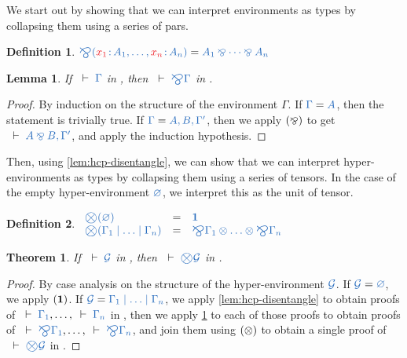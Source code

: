 \documentclass[draft,submission,copyright,creativecommons]{eptcs}
\newtheorem{definition}{Definition}
\newtheorem{lemma}{Lemma}
\newtheorem{theorem}{Theorem}
\begin{document}
We start out by showing that we can interpret environments as types by collapsing them using a series of pars.
\begin{definition}\label{def:bigparr}
  \(
  \ty{\bigparr(\tmty{x_1}{A_1} , \dots , \tmty{x_n}{A_n})} =
  \ty{A_1 \parr \dots \parr A_n}
  \)
\end{definition}\noindent
\begin{lemma}\label{lem:cp-bigparr}
  If $\seq{\Gamma}$ in \cp, then $\seq{\bigparr\Gamma}$ in \cp.
\end{lemma}\vspace*{-0.75\baselineskip}%
\begin{proof}
  By induction on the structure of the environment $\Gamma$.
  If $\ty{\Gamma} = \ty{A}$, then the statement is trivially true.
  If $\ty{\Gamma} = \ty{A, B, \Gamma'}$, then we apply $(\mathbin{\bindnasrepma})$ to get $\seq{A
    \parr B, \Gamma'}$, and apply the induction hypothesis.
\end{proof}\noindent
Then, using \cref{lem:hcp-disentangle}, we can show that we can interpret hyper-environments as types by collapsing them using a series of tensors. In the case of the empty hyper-environment $\ty{\emptyhypercontext}$, we interpret this as the unit of tensor.
\begin{definition}\label{def:bigtens}
  \(
  \begin{array}{lcl}
    \ty{\bigtens(\emptyhypercontext)}
    & = & \ty{\one}
    \\
    \ty{\bigtens(\Gamma_1 \hsep \dots \hsep \Gamma_n)}
    & = & \ty{\bigparr\Gamma_1 \tens \dots \tens \bigparr\Gamma_n}
  \end{array}
  \)
\end{definition}\noindent

\begin{theorem}\label{thm:hcp2cp-bigtens}
  If $\seq{\mathcal{G}}$ in \hcp, then $\seq{\bigtens\mathcal{G}}$ in \cp.
\end{theorem}\vspace*{-0.75\baselineskip}%
\begin{proof}
  By case analysis on the structure of the hyper-environment $\ty{\mathcal{G}}$.
  If $\ty{\mathcal{G}} = \ty{\emptyhypercontext}$, we apply $(\mathbf{1})$.
  If $\ty{\mathcal{G}} = \ty{\Gamma_1 \hsep \dots \hsep \Gamma_n}$, we apply \cref{lem:hcp-disentangle} to obtain proofs of $\seq{\Gamma_1}, \dots, \seq{\Gamma_n}$ in \cp, then we apply \cref{lem:cp-bigparr} to each of those proofs to obtain proofs of $\seq{\bigparr\Gamma_1}, \dots, \seq{\bigparr\Gamma_n}$, and join them using $(\otimes)$ to obtain a single proof of $\seq{\bigtens\mathcal{G}}$ in \cp.
\end{proof}\noindent
\end{document}
